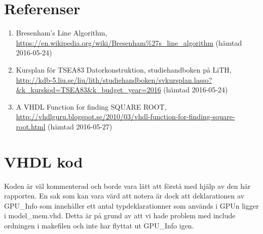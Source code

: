 \documentclass[a4paper]{article}
\begin{document}
    \section{Referenser}
    \begin{enumerate}
      \item Bresenham's Line Algorithm, \url{https://en.wikipedia.org/wiki/Bresenham\%27s_line_algorithm} (hämtad 2016-05-24)
      \item Kursplan för TSEA83 Datorkonstruktion, 
        studiehandboken på LiTH, \url{http://kdb-5.liu.se/liu/lith/studiehandboken/svkursplan.lasso?&k_kurskod=TSEA83&k_budget_year=2016} (hämtad 2016-05-24)
      \item A VHDL Function for finding SQUARE ROOT, \url{http://vhdlguru.blogspot.se/2010/03/vhdl-function-for-finding-square-root.html} (hämtad 2016-05-27)
    \end{enumerate}

    \section{VHDL kod}
    Koden är väl kommenterad och borde vara lätt att förstå med hjälp av den här
    rapporten. En sak som kan vara värd att notera är dock att deklarationen av
    GPU\_Info som innehåller ett antal typdeklarationner som används i GPUn
    ligger i model\_mem.vhd. Detta är på grund av att vi hade problem med
    include ordningen i makefilen och inte har flyttat ut GPU\_Info igen.
\end{document}
